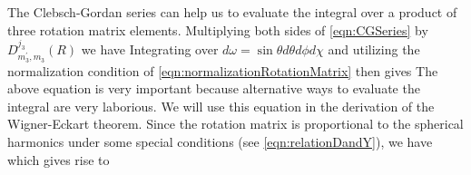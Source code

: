 The Clebsch-Gordan series can help us to evaluate the integral over a product of three rotation matrix elements. 
Multiplying both sides of \autoref{eqn:CGSeries} by $D^{j_3}_{m_3^{\prime}, m_3}(R)$ we have
Integrating over $d\omega = \sin\theta d\theta d\phi  d\chi$ and utilizing the normalization condition of \autoref{eqn:normalizationRotationMatrix} then gives
The 
above equation is very important because alternative ways to evaluate the integral are very laborious. We will use this
equation in the derivation of the Wigner-Eckart theorem. 
Since the rotation matrix is proportional to the spherical
harmonics under some special conditions (see \autoref{eqn:relationDandY}), we have
which gives rise to



